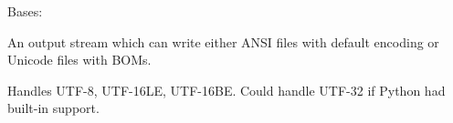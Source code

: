 \documentclass[a4paper,10pt,english]{sphinxmanual}
\begin{document}
\begin{fulllineitems}
\label{commands/apidoc/src:src.pyconf.ConfigOutputStream}
Bases: 

An output stream which can write either ANSI files with default encoding
or Unicode files with BOMs.

Handles UTF-8, UTF-16LE, UTF-16BE. Could handle UTF-32 if Python had
built-in support.

\begin{fulllineitems}
\label{commands/apidoc/src:src.pyconf.ConfigOutputStream.close}
\end{fulllineitems}


\begin{fulllineitems}
\label{commands/apidoc/src:src.pyconf.ConfigOutputStream.flush}
\end{fulllineitems}


\begin{fulllineitems}
\label{commands/apidoc/src:src.pyconf.ConfigOutputStream.write}
\end{fulllineitems}


\end{fulllineitems}

\end{document}
